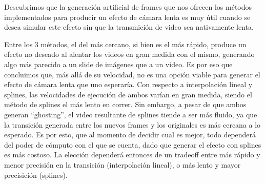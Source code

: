 Descubrimos que la generaci\'on artificial de frames que nos ofrecen los m\'etodos implementados para producir un efecto de c\'amara lenta es muy \'util cuando se desea simular este efecto sin que la transmici\'on de video sea nativamente lenta. 

Entre los 3 m\'etodos, el del m\'as cercano, si bien es el m\'as r\'apido, produce un efecto no deseado al alentar los videos en gran medida con el mismo, generando algo m\'as parecido a un slide de im\'agenes que a un video. Es por eso que concluimos que, m\'as all\'a de su velocidad, no es una opci\'on viable para generar el efecto de c\'amara lenta que uno esperar\'ia. Con respecto a interpolaci\'on lineal y splines, las velocidades de ejecuci\'on de ambos var\'ian en gran medida, siendo el m\'etodo de splines el m\'as lento en correr. Sin embargo, a pesar de que ambos generan ``ghosting'', el video resultante de splines tiende a ser m\'as fluido, ya que la transici\'on generada entre los nuevos frames y los originales es m\'as cercana a lo esperado. Es por esto, que al momento de decidir cual es mejor, todo depender\'a del poder de c\'omputo con el que se cuenta, dado que generar el efecto con splines es m\'as costoso. La elecci\'on depender\'a entonces de un tradeoff entre m\'as r\'apido y menor precisi\'on en la transici\'on (interpolaci\'on lineal), o m\'as lento y mayor precisici\'on (splines). 
